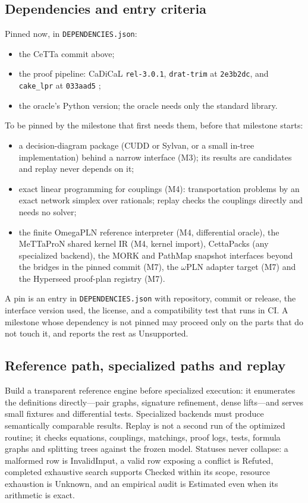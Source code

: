\documentclass[11pt]{article}
\newcommand{\code}[1]{\texttt{#1}}
\begin{document}
\subsection{Dependencies and entry criteria}

Pinned now, in \code{DEPENDENCIES.json}:
\begin{itemize}
\item the CeTTa commit above;
\item the proof pipeline: CaDiCaL \code{rel-3.0.1}, \code{drat-trim} at \code{2e3b2dc}, and
\code{cake\_lpr} at \code{033aad5} \cite{drattrim,cakelpr};
\item the oracle's Python version; the oracle needs only the standard library.
\end{itemize}
To be pinned by the milestone that first needs them, before that milestone starts:
\begin{itemize}
\item a decision-diagram package (CUDD or Sylvan, or a small in-tree implementation) behind a narrow
interface (M3); its results are candidates and replay never depends on it;
\item exact linear programming for couplings (M4): transportation problems by an exact network simplex
over rationals; replay checks the couplings directly and needs no solver;
\item the finite OmegaPLN reference interpreter (M4, differential oracle), the MeTTaProN shared kernel
IR (M4, kernel import), CettaPacks (any specialized backend), the MORK and PathMap snapshot interfaces
beyond the bridges in the pinned commit (M7), the $\omega$PLN adapter target (M7) and the Hyperseed
proof-plan registry (M7).
\end{itemize}
A pin is an entry in \code{DEPENDENCIES.json} with repository, commit or release, the interface
version used, the license, and a compatibility test that runs in CI. A milestone whose dependency is
not pinned may proceed only on the parts that do not touch it, and reports the rest as Unsupported.

\subsection{Reference path, specialized paths and replay}

Build a transparent reference engine before specialized execution: it enumerates the definitions
directly---pair graphs, signature refinement, dense lifts---and serves small fixtures and differential
tests. Specialized backends must produce semantically comparable results. Replay is not a second run
of the optimized routine; it checks equations, couplings, matchings, proof logs, tests, formula graphs
and splitting trees against the frozen model. Statuses never collapse: a malformed row is InvalidInput,
a valid row exposing a conflict is Refuted, completed exhaustive search supports Checked within its
scope, resource exhaustion is Unknown, and an empirical audit is Estimated even when its arithmetic is
exact.
\end{document}
